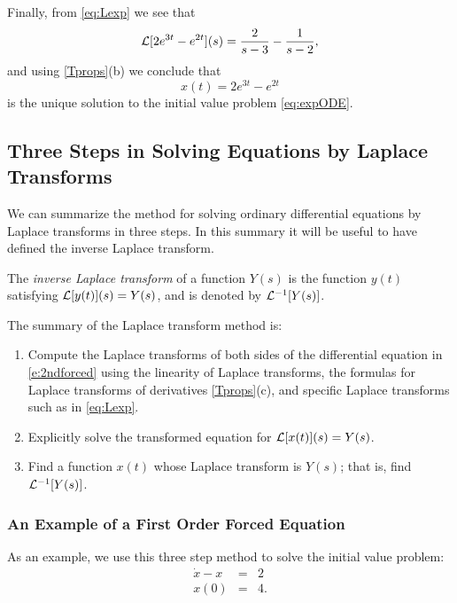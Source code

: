 \documentclass{ximera}
\begin{document}
Finally, from \eqref{eq:Lexp} we see that 
\[
{\cal L}[2e^{3t}-e^{2t}](s) = \frac{2}{s-3} - \frac{1}{s-2},
\]
and using \eqref{Tprops}(b) we conclude that
\[
x(t) = 2e^{3t}-e^{2t} 
\]
is the unique solution to the initial value problem \eqref{eq:expODE}. 

\subsection*{Three Steps in Solving Equations by Laplace Transforms} 

We can summarize the method for solving ordinary differential equations by
Laplace transforms in three steps.  In this summary it will be useful to 
have defined the inverse Laplace transform.
\begin{definition}  \label{D:invLaplace}
The {\em inverse Laplace transform\/} of a function $Y(s)$ is the function 
$y(t)$ satisfying ${\cal L}[y(t)](s) = Y(s)$, and is denoted by  
${\cal L}^{-1}[Y(s)]$.
\end{definition}

The summary of the Laplace transform method is: 
\begin{enumerate}
\item	Compute the Laplace transforms of both sides of the differential 
equation in \eqref{e:2ndforced} using the linearity of Laplace transforms, the 
formulas for Laplace transforms of derivatives \eqref{Tprops}(c), and specific 
Laplace transforms such as in \eqref{eq:Lexp}.
\item	Explicitly solve the transformed equation for 
${\cal L}[x(t)](s)=Y(s)$.
\item	Find a function $x(t)$ whose Laplace transform is $Y(s)$; that is, 
find ${\cal L}^{-1}[Y(s)]$.
\end{enumerate}

\subsubsection*{An Example of a First Order Forced Equation}

As an example, we use this three step method to solve the initial value 
problem:
\begin{equation}  \label{eq:dxx2}
\begin{array}{rcl}
\dot x - x & = & 2\\
  x(0) & = & 4.
\end{array}
\end{equation}
\end{document}
